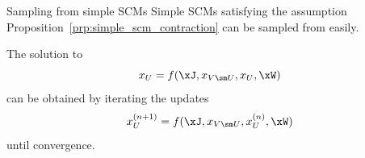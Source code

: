 \begin{frame}{Sampling from simple SCMs}
Simple SCMs satisfying the assumption Proposition~\ref{prp:simple_scm_contraction} can be sampled from easily.
\begin{Rem}
   The solution to 
  $$x_U = f(\xJ,x_{V\sm U},x_U,\xW)$$
can be obtained by iterating the updates
  $$x_U^{(n+1)} = f(\xJ,x_{V\sm U},x_U^{(n)},\xW)$$
until convergence.
\end{Rem}
\end{frame}

